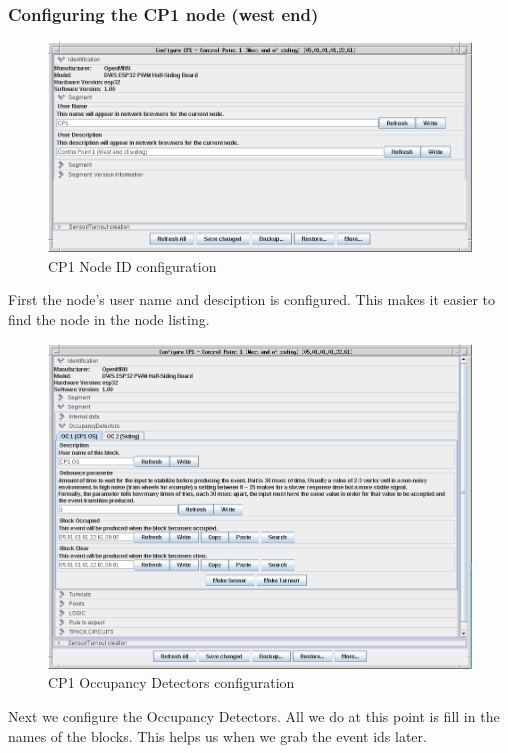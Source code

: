 \subsubsection{Configuring the CP1 node (west end)}

\begin{figure}[hbpt]\begin{centering}%
\includegraphics[width=5in]{CP1-ID-Config.png}
\caption{CP1 Node ID configuration}
\label{fig:CP1-ID-Config}
\end{centering}\end{figure}
First the node's user name and desciption is configured.  This makes it easier 
to find the node in the node listing.

\clearpage
\begin{figure}[hbpt]\begin{centering}%
\includegraphics[width=5in]{CP1-OC-Config.png}
\caption{CP1 Occupancy Detectors configuration}
\label{fig:CP1-OC-Config}
\end{centering}\end{figure}
Next we configure the Occupancy Detectors.  All we do at this point is fill in 
the names of the blocks.  This helps us when we grab the event ids later.
 
